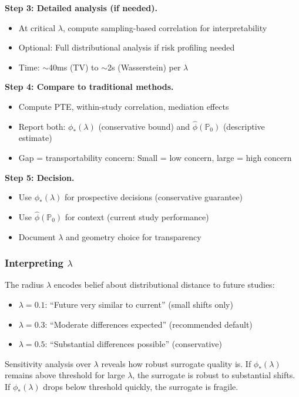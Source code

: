 \documentclass{article}
\newcommand{\PP}{\mathbb{P}}
\begin{document}
\textbf{Step 3: Detailed analysis (if needed).}
\begin{itemize}
    \item At critical $\lambda$, compute sampling-based correlation for interpretability
    \item Optional: Full distributional analysis if risk profiling needed
    \item Time: $\sim$40ms (TV) to $\sim$2s (Wasserstein) per $\lambda$
\end{itemize}

\textbf{Step 4: Compare to traditional methods.}
\begin{itemize}
    \item Compute PTE, within-study correlation, mediation effects
    \item Report both: $\phi_*(\lambda)$ (conservative bound) and $\hat{\phi}(\PP_0)$ (descriptive estimate)
    \item Gap = transportability concern: Small = low concern, large = high concern
\end{itemize}

\textbf{Step 5: Decision.}
\begin{itemize}
    \item Use $\phi_*(\lambda)$ for prospective decisions (conservative guarantee)
    \item Use $\hat{\phi}(\PP_0)$ for context (current study performance)
    \item Document $\lambda$ and geometry choice for transparency
\end{itemize}

\subsubsection{Interpreting $\lambda$}

The radius $\lambda$ encodes belief about distributional distance to future studies:
\begin{itemize}
    \item $\lambda = 0.1$: ``Future very similar to current'' (small shifts only)
    \item $\lambda = 0.3$: ``Moderate differences expected'' (recommended default)
    \item $\lambda = 0.5$: ``Substantial differences possible'' (conservative)
\end{itemize}

Sensitivity analysis over $\lambda$ reveals how robust surrogate quality is. If $\phi_*(\lambda)$ remains above threshold for large $\lambda$, the surrogate is robust to substantial shifts. If $\phi_*(\lambda)$ drops below threshold quickly, the surrogate is fragile.
\end{document}
